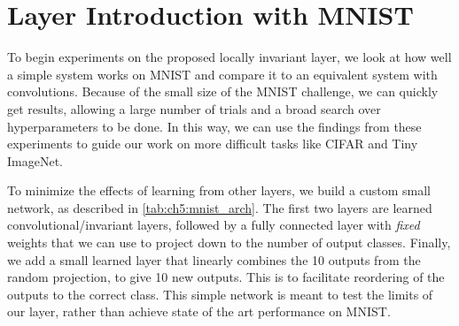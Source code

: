 
\section{Layer Introduction with MNIST}\label{sec:ch5:mnist}



To begin experiments on the proposed locally invariant layer, we look at how
well a simple system works on MNIST and compare it to an equivalent system with
convolutions. Because of the small size of the MNIST challenge, we can quickly
get results, allowing a large number of trials and a broad search over
hyperparameters to be done. In this way, we can use the findings from these
experiments to guide our work on more difficult tasks like CIFAR and Tiny
ImageNet.

To minimize the effects of learning from other layers, we build a
custom small network, as described in \autoref{tab:ch5:mnist_arch}. 
The first two layers are learned convolutional/invariant layers, followed by
a fully connected layer with \emph{fixed} weights that we can use to project down to
the number of output classes. Finally, we add a small learned layer that
linearly combines the 10 outputs from the random projection, to give 10 new
outputs. This is to facilitate reordering of the outputs to the correct class.
This simple network is meant to test the limits of our layer, rather than
achieve state of the art performance on MNIST.

